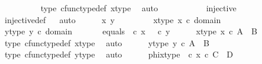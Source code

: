\begin{isabellebody}
\ \ \ \ \ \ \ \ \isamarkupfalse%
\ {\isasymphi}{\isacharunderscore}{\kern0pt}type\ cfunc{\isacharunderscore}{\kern0pt}type{\isacharunderscore}{\kern0pt}def\ x{\isacharunderscore}{\kern0pt}type\ \isamarkupfalse%
\ auto\isanewline
\ \ \ \ \isamarkupfalse%
\isanewline
\ \ \isamarkupfalse%
\isanewline
\isanewline
\ \ \isamarkupfalse%
\ {\isachardoublequoteopen}injective{\isacharparenleft}{\kern0pt}{\isasymphi}{\isacharparenright}{\kern0pt}{\isachardoublequoteclose}\isanewline
\ \ \ \ \isamarkupfalse%
\ injective{\isacharunderscore}{\kern0pt}def\isanewline
\ \ \isamarkupfalse%
{\isacharparenleft}{\kern0pt}auto{\isacharparenright}{\kern0pt}\isanewline
\ \ \ \ \isamarkupfalse%
\ x\ y\ \ \ \isanewline
\ \ \ \ \isamarkupfalse%
\ x{\isacharunderscore}{\kern0pt}type{\isacharcolon}{\kern0pt}\ {\isachardoublequoteopen}x\ {\isasymin}\isactrlsub c\ domain\ {\isasymphi}{\isachardoublequoteclose}\isanewline
\ \ \ \ \isamarkupfalse%
\ y{\isacharunderscore}{\kern0pt}type{\isacharcolon}{\kern0pt}\ {\isachardoublequoteopen}y\ {\isasymin}\isactrlsub c\ domain\ {\isasymphi}{\isachardoublequoteclose}\isanewline
\ \ \ \ \isamarkupfalse%
\ equals{\isacharcolon}{\kern0pt}\ {\isachardoublequoteopen}{\isasymphi}\ {\isasymcirc}\isactrlsub c\ x\ {\isacharequal}{\kern0pt}\ {\isasymphi}\ {\isasymcirc}\isactrlsub c\ y{\isachardoublequoteclose}\isanewline
\ \ \ \ \isamarkupfalse%
\ x{\isacharunderscore}{\kern0pt}type{}{\isacharcolon}{\kern0pt}\ {\isachardoublequoteopen}x\ {\isasymin}\isactrlsub c\ A\ {\isasymCoprod}\ B{\isachardoublequoteclose}\isanewline
\ \ \ \ \ \ \isamarkupfalse%
\ {\isasymphi}{\isacharunderscore}{\kern0pt}type\ cfunc{\isacharunderscore}{\kern0pt}type{\isacharunderscore}{\kern0pt}def\ x{\isacharunderscore}{\kern0pt}type\ \isamarkupfalse%
\ auto\isanewline
\ \ \ \ \isamarkupfalse%
\ y{\isacharunderscore}{\kern0pt}type{}{\isacharcolon}{\kern0pt}\ {\isachardoublequoteopen}y\ {\isasymin}\isactrlsub c\ A\ {\isasymCoprod}\ B{\isachardoublequoteclose}\isanewline
\ \ \ \ \ \ \isamarkupfalse%
\ {\isasymphi}{\isacharunderscore}{\kern0pt}type\ cfunc{\isacharunderscore}{\kern0pt}type{\isacharunderscore}{\kern0pt}def\ y{\isacharunderscore}{\kern0pt}type\ \isamarkupfalse%
\ auto\isanewline
\isanewline
\ \ \ \ \isamarkupfalse%
\ phix{\isacharunderscore}{\kern0pt}type{\isacharcolon}{\kern0pt}\ {\isachardoublequoteopen}{\isasymphi}\ {\isasymcirc}\isactrlsub c\ x\ {\isasymin}\isactrlsub c\ C\ {\isasymCoprod}\ D{\isachardoublequoteclose}\isanewline

\end{isabellebody}
